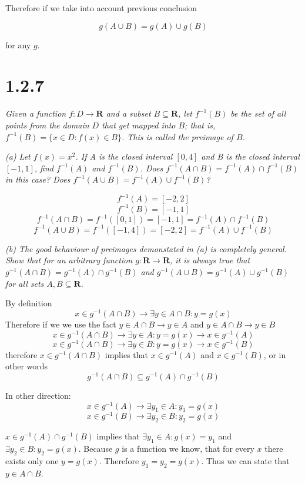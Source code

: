 \documentclass[11pt,oneside,titlepage]{article}
\begin{document}
Therefore if we take into account previous conclusion

$$g(A \cup B) = g(A) \cup g(B)$$

for any $g$.

\section*{1.2.7}

\textit{Given a function $f: D \to \textbf{R}$ and a subset $B \subseteq \textbf{R}$, let $f^{-1}(B)$ be the set of all points from the domain $D$ that get mapped into $B$; that is, $f^{-1}(B) = \{x \in D: f(x) \in B\}$. This is called
  the preimage of $B$.}

\textit{(a) Let $f(x) = x^2$. If A is the closed interval $[0,4]$ and B is the
  closed interval $[-1, 1]$, find $f^{-1}(A)$ and $f^{-1}(B)$. Does
  $f^{-1}(A \cap B) = f^{-1}(A) \cap f^{-1}(B)$ in this case? Does
  $f^{-1}(A \cup B) = f^{-1}(A) \cup f^{-1}(B)$?
}

$$f^{-1}(A) = [-2, 2]$$
$$f^{-1}(B) = [-1, 1]$$
$$f^{-1}(A \cap B) = f^{-1}([0, 1]) = [-1, 1] = f^{-1}(A) \cap f^{-1}(B)$$
$$f^{-1}(A \cup B) = f^{-1}([-1, 4]) = [-2, 2] = f^{-1}(A) \cup f^{-1}(B)$$

\textit{(b) The good behaviour of preimages demonstated in (a) is completely
  general. Show that for an arbitrary function $g: \textbf{R} \to \textbf{R}$,
  it is always true that $g^{-1}(A \cap B) = g^{-1}(A) \cap g^{-1}(B)$ and
  $g^{-1}(A \cup B) = g^{-1}(A) \cup g^{-1}(B)$ for all sets $A, B \subseteq \textbf{R}$.
}

By definition
$$ x \in g^{-1}(A \cap B) \to \exists y \in A \cap B: y = g(x)$$
Therefore if we we use the fact  $y \in A \cap B \to y \in A$ and $y \in A \cap B \to y \in B$
$$ x \in g^{-1}(A \cap B) \to \exists y \in A: y = g(x) \to x \in g^{-1}(A)$$
$$ x \in g^{-1}(A \cap B) \to \exists y \in B: y = g(x) \to x \in g^{-1}(B)$$
therefore $x \in g^{-1}(A \cap B)$ implies that $x \in g^{-1}(A)$ and $x \in g^{-1}(B)$, or in other words
$$g^{-1}(A \cap B) \subseteq g^{-1}(A) \cap g^{-1}(B)$$

In other direction: 
$$x \in g^{-1}(A) \to \exists y_1 \in A: y_1 = g(x)$$
$$x \in g^{-1}(B) \to \exists y_2 \in B: y_2 = g(x)$$

$x \in g^{-1}(A) \cap g^{-1}(B)$ implies that $ \exists y_1 \in A: g(x) = y_1$ and $\exists y_2 \in B: y_2 = g(x)$. Because $g$ is a function we know, that
for every $x$ there exists only one $y = g(x)$. Therefore $y_1 = y_2 = g(x)$.
Thus we can state that $y \in A \cap B$.
\end{document}
